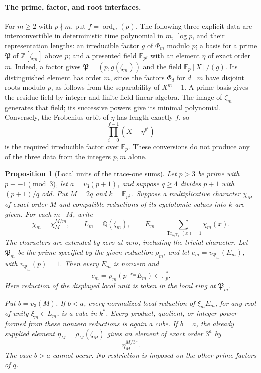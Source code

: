 \documentclass[11pt]{article}
\newcommand{\Q}{\mathbb Q}
\newcommand{\F}{\mathbb F}
\newcommand{\Z}{\mathbb Z}
\newcommand{\ord}{\operatorname{ord}}
\newtheorem{proposition}[theorem]{Proposition}
\theoremstyle{definition}
\theoremstyle{remark}
\begin{document}
\paragraph{The prime, factor, and root interfaces.}
For $m\ge2$ with $p\nmid m$, put $f=\ord_m(p)$.  The following three
explicit data are interconvertible in deterministic time polynomial
in $m$, $\log p$, and their representation lengths: an irreducible
factor $g$ of $\Phi_m$ modulo $p$; a basis for a prime $\mathfrak P$
of $\Z[\zeta_m]$ above $p$; and a presented field $\F_{p^f}$ with an
element $\eta$ of exact order $m$.  Indeed, a factor gives
$\mathfrak P=(p,g(\zeta_m))$ and the field $\F_p[X]/(g)$.
Its distinguished element has order $m$, since the factors
$\Phi_d$ for $d\mid m$ have disjoint roots modulo $p$, as follows
from the separability of $X^m-1$.  A prime basis gives the residue
field by integer and finite-field linear algebra.  The image of
$\zeta_m$ generates that field; its successive powers give its
minimal polynomial.  Conversely, the Frobenius orbit of $\eta$ has
length exactly $f$, so
\[
 \prod_{i=0}^{f-1}(X-\eta^{p^i})
\]
is the required irreducible factor over $\F_p$.  These conversions
do not produce any of the three data from the integers $p,m$ alone.

\begin{proposition}[Local units of the trace-one sums]
\label{prop:tal-trace-local-units}
Let $p>3$ be prime with $p\equiv-1\pmod3$, let
$a=v_3(p+1)$, and suppose $q\ge4$ divides $p+1$ with
$(p+1)/q$ odd.  Put $M=2q$ and $k=\F_{p^2}$.
Suppose a multiplicative character $\chi_M$ of exact order $M$
and compatible reductions of its cyclotomic values into $k$ are
given.  For each $m\mid M$, write
\[
 \chi_m=\chi_M^{M/m},\qquad L_m=\Q(\zeta_m),\qquad
 E_m=\sum_{\operatorname{Tr}_{k/\F_p}(x)=1}\chi_m(x).
\]
The characters are extended by zero at zero, including the trivial
character.  Let $\mathfrak P_m$ be the prime specified by the given
reduction $\rho_m$, and let $e_m=v_{\mathfrak P_m}(E_m)$, with
$v_{\mathfrak P_m}(p)=1$.  Then every $E_m$ is nonzero and
\[
 c_m=\rho_m(p^{-e_m}E_m)\in\F_p^*.
\]
Here reduction of the displayed local unit is taken in the local
ring at $\mathfrak P_m$.

Put $b=v_3(M)$.  If $b<a$, every normalized local reduction of
$\xi_m E_m$, for any root of unity $\xi_m\in L_m$, is a cube in
$k^*$.  Every product, quotient, or integer power formed from these
nonzero reductions is again a cube.  If $b=a$, the already supplied
element $\eta_M=\rho_M(\zeta_M)$ gives an element of exact order
$3^a$ by
\[
 \eta_M^{M/3^a}.
\]
The case $b>a$ cannot occur.  No restriction is imposed on the other
prime factors of $q$.
\end{proposition}
\end{document}
